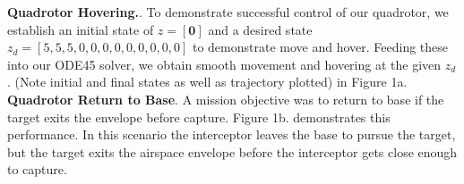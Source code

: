 \documentclass{article}
\begin{document}
\begin{multicols}{2}
\textbf{Quadrotor Hovering.}. To demonstrate successful control of our quadrotor, we establish an initial state of $z=[\mathbf{0}]$ and 
a desired state $z_d=[5,5,5,0,0,0,0,0,0,0,0,0] $ to demonstrate move and hover.  Feeding these into our ODE45 solver, we obtain 
smooth movement and hovering at the given $z_d$.  (Note initial and final states as well as trajectory plotted) in Figure 1a.\\

\textbf{Quadrotor Return to Base}. A mission objective was to return to base if the target exits the envelope before capture.  
Figure 1b. demonstrates this performance. In this scenario the interceptor leaves the base to pursue the target, but the target exits the airspace envelope before the interceptor gets close enough to capture.\\


\end{multicols}
\end{document}
